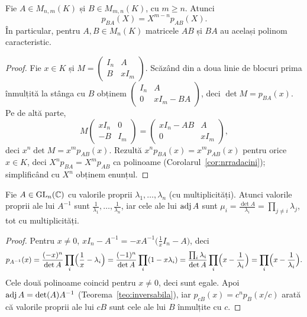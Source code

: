 \begin{propozitie}\label{prop:ABBA}
Fie $A\in M_{n,m}(K)$ și $B\in M_{m,n}(K)$, cu $m\ge n$. Atunci
\[
p_{BA}(X)=X^{m-n}p_{AB}(X).
\]
În particular, pentru $A,B\in M_n(K)$ matricele $AB$ și $BA$ au același polinom caracteristic.
\end{propozitie}

\begin{proof}
Fie $x\in K$ și $M=\begin{pmatrix}I_n&A\\B&xI_m\end{pmatrix}$. Scăzând din a doua linie de blocuri prima înmulțită la stânga cu $B$ obținem $\begin{pmatrix}I_n&A\\0&xI_m-BA\end{pmatrix}$, deci $\det M=p_{BA}(x)$. Pe de altă parte,
\[
M\begin{pmatrix}xI_n&0\\-B&I_m\end{pmatrix}=\begin{pmatrix}xI_n-AB&A\\0&xI_m\end{pmatrix},
\]
deci $x^n\det M=x^mp_{AB}(x)$. Rezultă $x^np_{BA}(x)=x^mp_{AB}(x)$ pentru orice $x\in K$, deci $X^np_{BA}=X^mp_{AB}$ ca polinoame (Corolarul~\ref{cor:nrradacini}); simplificând cu $X^n$ obținem enunțul.
\end{proof}

\begin{propozitie}\label{prop:valpropinversa}
Fie $A\in\mathrm{GL}_n(\mathbb{C})$ cu valorile proprii $\lambda_1,\dots,\lambda_n$ (cu multiplicități). Atunci valorile proprii ale lui $A^{-1}$ sunt $\frac1{\lambda_1},\dots,\frac1{\lambda_n}$, iar cele ale lui $\operatorname{adj} A$ sunt $\mu_i=\frac{\det A}{\lambda_i}=\prod_{j\neq i}\lambda_j$, tot cu multiplicități.
\end{propozitie}

\begin{proof}
Pentru $x\neq0$, $xI_n-A^{-1}=-xA^{-1}\bigl(\tfrac1xI_n-A\bigr)$, deci
\[
p_{A^{-1}}(x)=\frac{(-x)^n}{\det A}\prod_i\Bigl(\frac1x-\lambda_i\Bigr)=\frac{(-1)^n}{\det A}\prod_i(1-x\lambda_i)=\frac{\prod_i\lambda_i}{\det A}\prod_i\Bigl(x-\frac1{\lambda_i}\Bigr)=\prod_i\Bigl(x-\frac1{\lambda_i}\Bigr).
\]
Cele două polinoame coincid pentru $x\neq0$, deci sunt egale. Apoi $\operatorname{adj} A=\det(A)A^{-1}$ (Teorema~\ref{teo:inversabila}), iar $p_{cB}(x)=c^np_B(x/c)$ arată că valorile proprii ale lui $cB$ sunt cele ale lui $B$ înmulțite cu $c$.
\end{proof}

